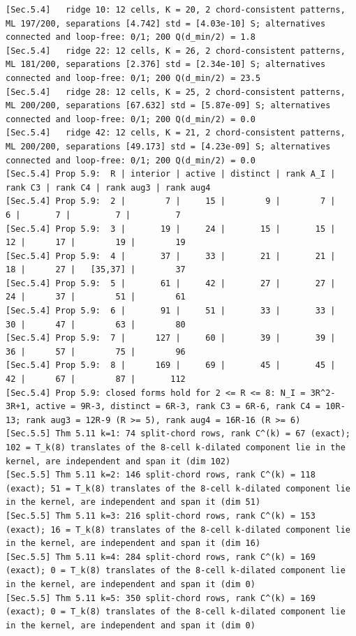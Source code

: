 \documentclass[11pt,a4paper]{article}
\theoremstyle{definition}
\theoremstyle{remark}
\begin{document}
\begin{lstlisting}[style=consolestyle]
[Sec.5.4]   ridge 10: 12 cells, K = 20, 2 chord-consistent patterns, ML 197/200, separations [4.742] std = [4.03e-10] S; alternatives connected and loop-free: 0/1; 200 Q(d_min/2) = 1.8
[Sec.5.4]   ridge 22: 12 cells, K = 26, 2 chord-consistent patterns, ML 181/200, separations [2.376] std = [2.34e-10] S; alternatives connected and loop-free: 0/1; 200 Q(d_min/2) = 23.5
[Sec.5.4]   ridge 28: 12 cells, K = 25, 2 chord-consistent patterns, ML 200/200, separations [67.632] std = [5.87e-09] S; alternatives connected and loop-free: 0/1; 200 Q(d_min/2) = 0.0
[Sec.5.4]   ridge 42: 12 cells, K = 21, 2 chord-consistent patterns, ML 200/200, separations [49.173] std = [4.23e-09] S; alternatives connected and loop-free: 0/1; 200 Q(d_min/2) = 0.0
[Sec.5.4] Prop 5.9:  R | interior | active | distinct | rank A_I | rank C3 | rank C4 | rank aug3 | rank aug4
[Sec.5.4] Prop 5.9:  2 |        7 |     15 |        9 |        7 |       6 |       7 |         7 |         7
[Sec.5.4] Prop 5.9:  3 |       19 |     24 |       15 |       15 |      12 |      17 |        19 |        19
[Sec.5.4] Prop 5.9:  4 |       37 |     33 |       21 |       21 |      18 |      27 |   [35,37] |        37
[Sec.5.4] Prop 5.9:  5 |       61 |     42 |       27 |       27 |      24 |      37 |        51 |        61
[Sec.5.4] Prop 5.9:  6 |       91 |     51 |       33 |       33 |      30 |      47 |        63 |        80
[Sec.5.4] Prop 5.9:  7 |      127 |     60 |       39 |       39 |      36 |      57 |        75 |        96
[Sec.5.4] Prop 5.9:  8 |      169 |     69 |       45 |       45 |      42 |      67 |        87 |       112
[Sec.5.4] Prop 5.9: closed forms hold for 2 <= R <= 8: N_I = 3R^2-3R+1, active = 9R-3, distinct = 6R-3, rank C3 = 6R-6, rank C4 = 10R-13; rank aug3 = 12R-9 (R >= 5), rank aug4 = 16R-16 (R >= 6)
[Sec.5.5] Thm 5.11 k=1: 74 split-chord rows, rank C^(k) = 67 (exact); 102 = T_k(8) translates of the 8-cell k-dilated component lie in the kernel, are independent and span it (dim 102)
[Sec.5.5] Thm 5.11 k=2: 146 split-chord rows, rank C^(k) = 118 (exact); 51 = T_k(8) translates of the 8-cell k-dilated component lie in the kernel, are independent and span it (dim 51)
[Sec.5.5] Thm 5.11 k=3: 216 split-chord rows, rank C^(k) = 153 (exact); 16 = T_k(8) translates of the 8-cell k-dilated component lie in the kernel, are independent and span it (dim 16)
[Sec.5.5] Thm 5.11 k=4: 284 split-chord rows, rank C^(k) = 169 (exact); 0 = T_k(8) translates of the 8-cell k-dilated component lie in the kernel, are independent and span it (dim 0)
[Sec.5.5] Thm 5.11 k=5: 350 split-chord rows, rank C^(k) = 169 (exact); 0 = T_k(8) translates of the 8-cell k-dilated component lie in the kernel, are independent and span it (dim 0)

\end{lstlisting}
\end{document}
